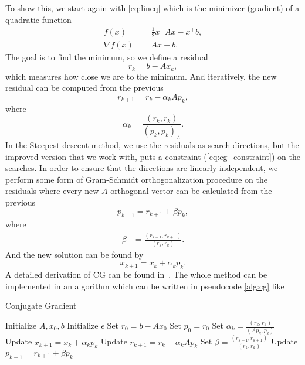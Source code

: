 To show this, we start again with \cref{eq:lineq} which is the minimizer (gradient) of a quadratic function
\begin{equation}
    \begin{aligned}
        f(x) &= \frac{1}{2} x^\top A x - x^\top b,
        \\
        \nabla f(x) &=  Ax - b.
    \end{aligned}
\end{equation}
The goal is to find the minimum, so we define a residual 
\begin{equation}
    r_k = b - Ax_k,
\end{equation}
which measures how close we are to the minimum. And iteratively, the new residual can be computed from the previous
\begin{equation}
    r_{k+1} = r_k - \alpha_k Ap_k,
\end{equation}
where
\begin{equation}
    \alpha_k = \frac{\left( r_k, r_k \right)}{\left( p_k, p_k \right)_A}.
\end{equation}
In the Steepest descent method, we use the residuals as search directions, but the improved version that we work with, puts a constraint (\cref{eq:cg_constraint}) on the searches. In order to ensure that the directions are linearly independent, we perform some form of Gram-Schmidt orthogonalization procedure on the residuals where every new $A$-orthogonal vector can be calculated from the previous
\begin{equation}
    p_{k+1} = r_{k+1} + \beta p_k,
\end{equation}
where
\begin{align}
    \beta &= \frac{\left( r_{k+1}, r_{k+1} \right)}{\left( r_k, r_k \right)}.
\end{align}
And the new solution can be found by
\begin{equation}
    x_{k+1} = x_k + \alpha_k p_k.
\end{equation}
A detailed derivation of CG can be found in~\cite{cgbook}. The whole method can be implemented in an algorithm which can be written in pseudocode \cref{alg:cg} like

\begin{algorithm}
    \caption{Conjugate Gradient}
    \begin{algorithmic}[1]
        \State Initialize  $A, x_0, b$
        \State Initialize $\epsilon$ 
        \State Set $r_0 = b - Ax_0$ 
        \State Set $p_0 = r_0$ 
            \State Set $\alpha_k = \frac{\left( r_k, r_k \right)}{\left( Ap_k, p_k \right)}$
            \State Update $x_{k+1} = x_k + \alpha_k p_k$
            \State Update $r_{k+1} = r_k - \alpha_k Ap_k$
            \State Set $\beta = \frac{\left( r_{k+1}, r_{k+1} \right)}{\left( r_k, r_k \right)}$
            \State Update $p_{k+1} = r_{k+1} + \beta p_k$
        \EndWhile
    \end{algorithmic}
    \label{alg:cg}
    \end{algorithm}

